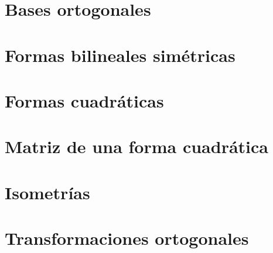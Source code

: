 \documentclass[0_algebra.tex]{subfiles}
\begin{document}
\section{Bases ortogonales}
\begin{figure}[h]
	\centering
	
\end{figure}
\section{Formas bilineales simétricas}
\begin{figure}[h]
	\centering
	
\end{figure}
\section{Formas cuadráticas}
\begin{figure}[h]
	\centering
	
\end{figure}
\section{Matriz de una forma cuadrática}
\begin{figure}[h]
	\centering
	
\end{figure}
\section{Isometrías}
\begin{figure}[h]
	\centering
	
\end{figure}
\section{Transformaciones ortogonales}
\begin{figure}[h]
	\centering
	
\end{figure}
\end{document}
